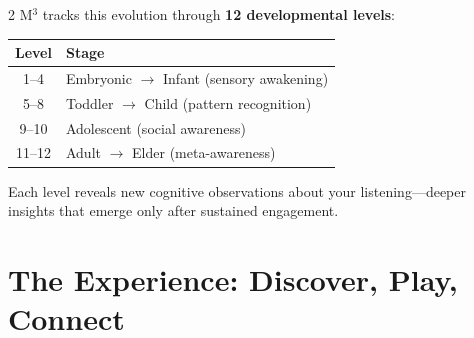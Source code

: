 \documentclass[10pt,a4paper]{article}
\begin{document}
\begin{multicols}{2}
\smallskip
M$^3$ tracks this evolution through \textbf{12 developmental levels}:

\vspace{4pt}
{\small
\begin{tabular}{@{}cl@{}}
  \toprule
  \textbf{Level} & \textbf{Stage} \\
  \midrule
  1--4 & Embryonic $\to$ Infant (sensory awakening) \\
  5--8 & Toddler $\to$ Child (pattern recognition) \\
  9--10 & Adolescent (social awareness) \\
  11--12 & Adult $\to$ Elder (meta-awareness) \\
  \bottomrule
\end{tabular}
}

\vspace{4pt}

Each level reveals new cognitive observations about your listening---deeper insights that emerge only after sustained engagement.

\end{multicols}

\newpage

\section{The Experience: Discover, Play, Connect}

\vspace{4pt}
\end{document}
